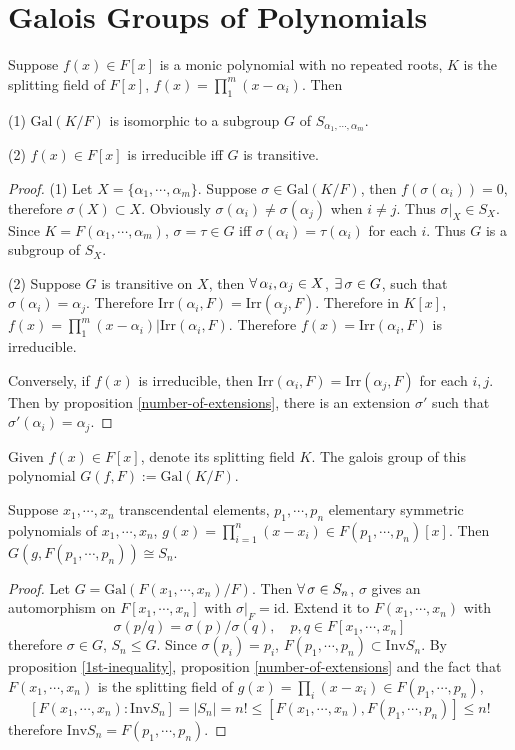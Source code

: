 \newpage
\section{Galois Groups of Polynomials}
\begin{proposition}
    Suppose $f(x)\in F[x]$ is a monic polynomial with no repeated roots, $K$ is the splitting field of $F[x]$, $f(x)=\prod^m_1(x-\alpha_i)$. Then
    \par (1) $\mathrm{Gal}(K/F)$ is isomorphic to a subgroup $G$ of $S_{\alpha_1,\cdots,\alpha_m}$.
    \par (2) $f(x)\in F[x]$ is irreducible iff $G$ is transitive.
\end{proposition}
\begin{proof}
    \par (1) Let $X=\{\alpha_1,\cdots,\alpha_m\}$. Suppose $\sigma\in\mathrm{Gal}(K/F)$, then $f(\sigma(\alpha_i))=0$, therefore $\sigma(X)\subset X$. Obviously $\sigma(\alpha_i)\neq\sigma(\alpha_j)$ when $i\neq j$. Thus $\sigma|_X\in S_X$. Since $K=F(\alpha_1,\cdots,\alpha_m)$, $\sigma=\tau\in G$ iff $\sigma(\alpha_i)=\tau(\alpha_i)$ for each $i$. Thus $G$ is a subgroup of $S_X$.
    \par (2) Suppose $G$ is transitive on $X$, then $\forall\,\alpha_i,\alpha_j\in X$, $\exists\,\sigma\in G$, such that $\sigma(\alpha_i)=\alpha_j$. Therefore $\mathrm{Irr}(\alpha_i,F)=\mathrm{Irr}(\alpha_j,F)$. Therefore in $K[x]$, $f(x)=\prod^m_1(x-\alpha_i)|\mathrm{Irr}(\alpha_i,F)$. Therefore $f(x)=\mathrm{Irr}(\alpha_i,F)$ is irreducible.
    \par Conversely, if $f(x)$ is irreducible, then $\mathrm{Irr}(\alpha_i,F)=\mathrm{Irr}(\alpha_j,F)$ for each $i,j$. Then by proposition \ref{number-of-extensions}, there is an extension $\sigma'$ such that $\sigma'(\alpha_i)=\alpha_j$.
\end{proof}
\begin{definition}
    Given $f(x)\in F[x]$, denote its splitting field $K$. The galois group of this polynomial $G(f,F):=\mathrm{Gal}(K/F)$.
\end{definition}
\begin{proposition}
    Suppose $x_1,\cdots,x_n$ transcendental elements, $p_1,\cdots,p_n$ elementary symmetric polynomials of $x_1,\cdots,x_n$, $g(x)=\prod^n_{i=1}(x-x_i)\in F(p_1,\cdots,p_n)[x]$. Then $G(g,F(p_1,\cdots,p_n))\cong S_n$.
\end{proposition}
\begin{proof}
    Let $G=\mathrm{Gal}(F(x_1,\cdots,x_n)/F)$. Then $\forall\,\sigma\in S_n$, $\sigma$ gives an automorphism on $F[x_1,\cdots,x_n]$ with $\sigma|_F=\mathrm{id}$. Extend it to $F(x_1,\cdots,x_n)$ with 
    $$
    \sigma(p/q)=\sigma(p)/\sigma(q),\quad p,q\in F[x_1,\cdots,x_n]
    $$
    therefore $\sigma\in G$, $S_n\le G$. Since $\sigma(p_i)=p_i$, $F(p_1,\cdots,p_n)\subset\mathrm{Inv}S_n$.
    By proposition \ref{1st-inequality}, proposition \ref{number-of-extensions} and the fact that $F(x_1,\cdots,x_n)$ is the splitting field of $g(x)=\prod_i(x-x_i)\in F(p_1,\cdots,p_n)$, 
    $$[F(x_1,\cdots,x_n):\mathrm{Inv}S_n]=|S_n|=n!\le[F(x_1,\cdots,x_n),F(p_1,\cdots,p_n)]\le n!$$
    therefore $\mathrm{Inv}S_n=F(p_1,\cdots,p_n)$.
\end{proof}
